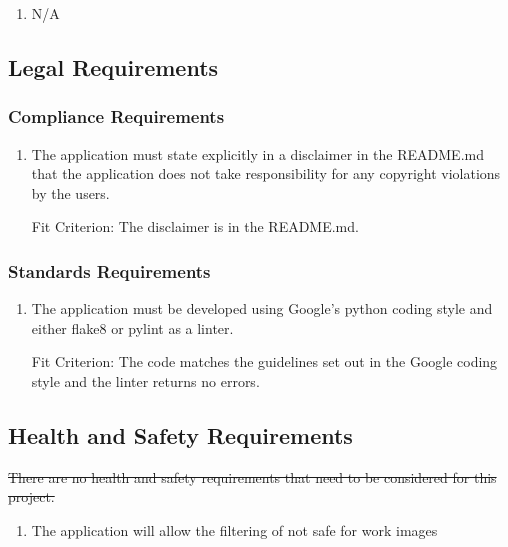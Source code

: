\documentclass[12pt, titlepage]{article}
\begin{document}
\begin{enumerate}[label=PR\arabic*:, wide=0pt, leftmargin=*]
    \item N/A
\end{enumerate}

\color{black}

\subsection{Legal Requirements}

\subsubsection{Compliance Requirements}
\begin{enumerate}[label=CPR\arabic*:, wide=0pt, leftmargin=*]
    \item The application must state explicitly in a disclaimer in the README.md that the application does not take responsibility for any copyright violations by the users.
    \item [Fit Criterion:] The disclaimer is in the README.md.
\end{enumerate}

\subsubsection{Standards Requirements}
\begin{enumerate}[label=SR\arabic*:, wide=0pt, leftmargin=*]
    \item The application must be developed using Google's python coding style and either flake8 or pylint as a linter.
    \item [Fit Criterion:] The code matches the guidelines set out in the Google coding style and the linter returns no errors.
\end{enumerate}

\subsection{Health and Safety Requirements}

\st{There are no health and safety requirements that need to be considered for this project.}

\color{red}

\begin{enumerate}[label=HSR\arabic*:, wide=0pt, leftmargin=*]
    \item The application will allow the filtering of not safe for work images
\end{enumerate}
\end{document}
